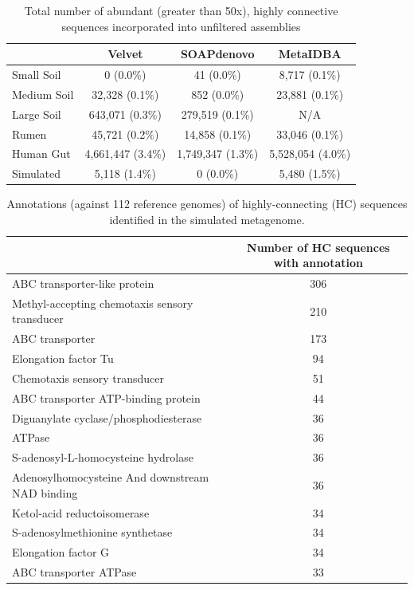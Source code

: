 \documentclass[10pt]{article}
\begin{document}
\begin{table}[h]
\caption{Total number of abundant (greater than 50x), highly connective sequences incorporated into unfiltered assemblies}
\begin{tabular}{l c c c}
 & Velvet & SOAPdenovo & MetaIDBA  \\
\hline
Small Soil & 0 (0.0\%) & 41 (0.0\%) & 8,717 (0.1\%) \\
Medium Soil &  32,328 (0.1\%) & 852 (0.0\%) & 23,881 (0.1\%) \\
Large Soil & 643,071 (0.3\%) & 279,519 (0.1\%) & N/A \\
Rumen & 45,721 (0.2\%) & 14,858 (0.1\%) & 33,046 (0.1\%) \\
Human Gut & 4,661,447 (3.4\%) & 1,749,347 (1.3\%) & 5,528,054 (4.0\%) \\
Simulated & 5,118 (1.4\%) & 0 (0.0\%) & 5,480 (1.5\%) \\
\hline
\end{tabular}
\label{assembly-stoptags}
\end{table}

\begin{table}
\caption{Annotations (against 112 reference genomes) of highly-connecting (HC) sequences identified in the simulated metagenome.}
\begin{tabular}{l c}
\hline
& Number of HC sequences with annotation\\
\hline
ABC transporter-like protein	&306\\
Methyl-accepting chemotaxis sensory transducer	&210\\
ABC transporter	&173\\
Elongation factor Tu	&94\\
Chemotaxis sensory transducer	&51\\
ABC transporter ATP-binding protein	&44\\
Diguanylate cyclase/phosphodiesterase	&36\\
ATPase	&36\\
S-adenosyl-L-homocysteine hydrolase	&36\\
Adenosylhomocysteine And downstream NAD binding	&36\\
Ketol-acid reductoisomerase	&34\\
S-adenosylmethionine synthetase	&34\\
Elongation factor G	&34\\
ABC transporter ATPase	&33\\
\end{tabular}
\label{sim-stoptags}
\end{table}
\end{document}
